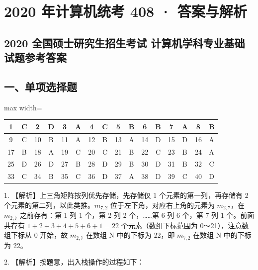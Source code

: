 \documentclass[UTF8,11pt]{ctexart}
\begin{document}
\section*{2020 年计算机统考 408 · 答案与解析}
\subsection*{2020 全国硕士研究生招生考试 计算机学科专业基础试题参考答案}

\subsection*{一、单项选择题}

\begin{center}\begin{adjustbox}{max width=\linewidth}\begin{tabular}{|c|c|c|c|c|c|c|c|c|c|c|c|c|c|c|c|}\hline
1 & C & 2 & D & 3 & A & 4 & C & 5 & B & 6 & B & 7 & A & 8 & B\\\hline
9 & C & 10 & B & 11 & A & 12 & B & 13 & A & 14 & D & 15 & D & 16 & A\\\hline
17 & B & 18 & A & 19 & C & 20 & C & 21 & B & 22 & C & 23 & B & 24 & A\\\hline
25 & D & 26 & D & 27 & B & 28 & D & 29 & B & 30 & D & 31 & B & 32 & C\\\hline
33 & C & 34 & B & 35 & C & 36 & D & 37 & A & 38 & D & 39 & C & 40 & D\\\hline\end{tabular}\end{adjustbox}\end{center}

1. 【解析】上三角矩阵按列优先存储，先存储仅 1 个元素的第一列，再存储有 2 个元素的第二列，以此类推。\(\displaystyle m_{7,\allowbreak 2}\) 位于左下角，对应右上角的元素为 \(\displaystyle m_{2,\allowbreak 7}\)，在 \(\displaystyle m_{2,\allowbreak 7}\) 之前存有：第 1 列 1 个，第 2 列 2 个，……第 6 列 6 个，第 7 列 1 个。前面共存有 \(\displaystyle 1+2+3+4+5+6+1=22\) 个元素（数组下标范围为 0～21），注意数组下标从 0 开始，故 \(\displaystyle m_{2,\allowbreak 7}\) 在数组 N 中的下标为 22，即 \(\displaystyle m_{7,\allowbreak 2}\) 在数组 N 中的下标为 22。


2. 【解析】按题意，出入栈操作的过程如下：
\end{document}
